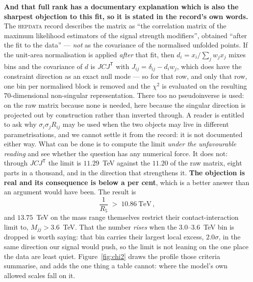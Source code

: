 \documentclass[11pt,a4paper]{article}
\begin{document}
\noindent\textbf{And that full rank has a documentary explanation which is also the sharpest
objection to this fit, so it is stated in the record's own words.} The \textsc{hepdata} record
describes the matrix as ``the correlation matrix of the maximum likelihood estimators of the signal
strength modifiers'', obtained ``after the fit to the data'' --- \emph{not} as the covariance of the
normalised unfolded points. If the unit-area normalisation is applied \emph{after} that fit, then
$d_i=x_i/\sum_j w_jx_j$ mixes bins and the covariance of $d$ is $JCJ^{\mathsf T}$ with
$J_{ij}=\delta_{ij}-d_iw_j$, which does have the constraint direction as an exact null mode --- so
for that row, and only that row, one bin per normalised block is removed and the $\chi^2$ is
evaluated on the resulting $70$-dimensional non-singular representation. There too no pseudoinverse
is used: on the raw matrix because none is needed, here because the singular direction is projected
out by construction rather than inverted through. A
reader is entitled to ask why $\sigma_i\sigma_jR_{ij}$ may be used when the two objects may live in
different parametrisations, and we cannot settle it from the record: it is not documented either
way. What can be done is to compute the limit \emph{under the unfavourable reading} and see whether
the question has any numerical force. It does not: through $JCJ^{\mathsf T}$ the limit is
$11.29$~TeV against the $11.20$ of the raw matrix, eight parts in a thousand, and in the direction
that strengthens it. \textbf{The objection is real and its consequence is below a per cent}, which
is a better answer than an argument would have been. The result is
\begin{equation}\label{eq:tulimit}
  \frac{1}{R_5}\;>\;10.86\ \text{TeV}\,,
\end{equation}
and $13.75$~TeV on the mass range \cite{CMSangular} themselves restrict their contact-interaction
limit to, $M_{jj}>3.6$~TeV. That the number \emph{rises} when the $3.0$--$3.6$~TeV bin is dropped
is worth saying: that bin carries their largest local excess, $2.0\sigma$, in the same direction
our signal would push, so the limit is not leaning on the one place the data are least quiet. Figure~\ref{fig:chi2} draws the profile those criteria summarise, and adds the one thing a table cannot: where the model's own allowed scales fall on it.
\end{document}
